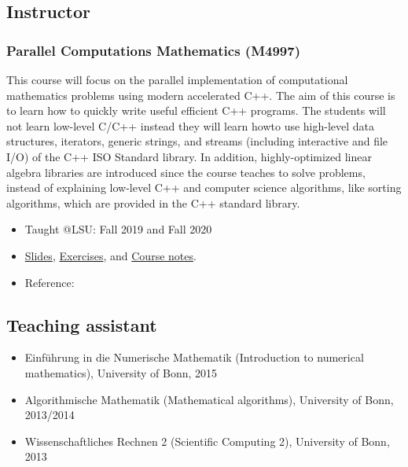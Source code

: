 \documentclass[11pt,a4paper]{article}
\begin{document}
\subsection*{Instructor}

\subsubsection*{Parallel Computations Mathematics (M4997)}
This course will focus on the parallel implementation of computational mathematics problems using modern accelerated C++. The aim of this course is to learn how to quickly write useful efficient C++ programs. The students will not learn low-level C/C++ instead they will learn howto use high-level data structures, iterators, generic strings, and streams (including interactive and file I/O) of the C++ ISO Standard library. In addition, highly-optimized linear algebra libraries are introduced since the course teaches to solve problems, instead of explaining low-level C++ and computer science algorithms, like sorting algorithms, which are provided in the C++ standard library.
\begin{itemize}
\item Taught @LSU: Fall 2019 and Fall 2020
\item \href{https://github.com/diehlpkteaching/ParallelComputationMath}{Slides}, \href{https://github.com/diehlpkteaching/ParallelComputationMathExercise}{Exercises}, and \href{https://github.com/diehlpkteaching/ParallelComputationMathScript}{Course notes}.
\item Reference:~\cite{https://doi.org/10.1002/cpe.6893}
\end{itemize}

\subsection*{Teaching assistant}
\begin{itemize}
\item Einf\"uhrung in die Numerische Mathematik (Introduction to numerical mathematics), University of Bonn, 2015
\item Algorithmische Mathematik (Mathematical algorithms), University of Bonn, 2013/2014
\item Wissenschaftliches Rechnen 2 (Scientific Computing 2),  University of Bonn, 2013 
\end{itemize}
\end{document}
